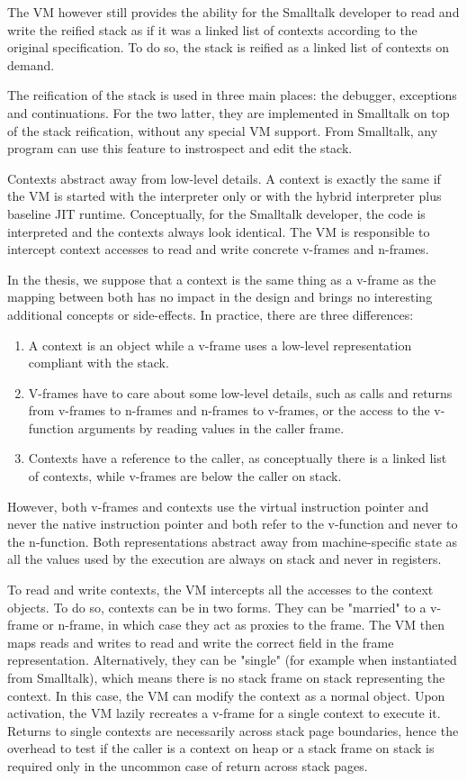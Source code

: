 \documentclass[a4paper,12pt,twoside]{../includes/ThesisStyle}
\begin{document}
The VM however still provides the ability for the Smalltalk developer to read and write the reified stack as if it was a linked list of contexts according to the original specification. To do so, the stack is reified as a linked list of contexts on demand. 

The reification of the stack is used in three main places: the debugger, exceptions and continuations. For the two latter, they are implemented in Smalltalk on top of the stack reification, without any special VM support. From Smalltalk, any program can use this feature to instrospect and edit the stack.

Contexts abstract away from low-level details. A context is exactly the same if the VM is started with the interpreter only or with the hybrid interpreter plus baseline JIT runtime. Conceptually, for the Smalltalk developer, the code is interpreted and the contexts always look identical. The VM is responsible to intercept context accesses to read and write concrete v-frames and n-frames.

In the thesis, we suppose that a context is the same thing as a v-frame as the mapping between both has no impact in the design and brings no interesting additional concepts or side-effects. In practice, there are three differences:
\begin{enumerate}
	\item A context is an object while a v-frame uses a low-level representation compliant with the stack.
	\item V-frames have to care about some low-level details, such as calls and returns from v-frames to n-frames and n-frames to v-frames, or the access to the v-function arguments by reading values in the caller frame. 
	\item Contexts have a reference to the caller, as conceptually there is a linked list of contexts, while v-frames are below the caller on stack.
\end{enumerate}
However, both v-frames and contexts use the virtual instruction pointer and never the native instruction pointer and both refer to the v-function and never to the n-function. Both representations abstract away from machine-specific state as all the values used by the execution are always on stack and never in registers.

To read and write contexts, the VM intercepts all the accesses to the context objects. To do so, contexts can be in two forms. They can be "married" to a v-frame or n-frame, in which case they act as proxies to the frame. The VM then maps reads and writes to read and write the correct field in the frame representation. Alternatively, they can be "single" (for example when instantiated from Smalltalk), which means there is no stack frame on stack representing the context. In this case, the VM can modify the context as a normal object. Upon activation, the VM lazily recreates a v-frame for a single context to execute it. Returns to single contexts are necessarily across stack page boundaries, hence the overhead to test if the caller is a context on heap or a stack frame on stack is required only in the uncommon case of return across stack pages. 
\end{document}
